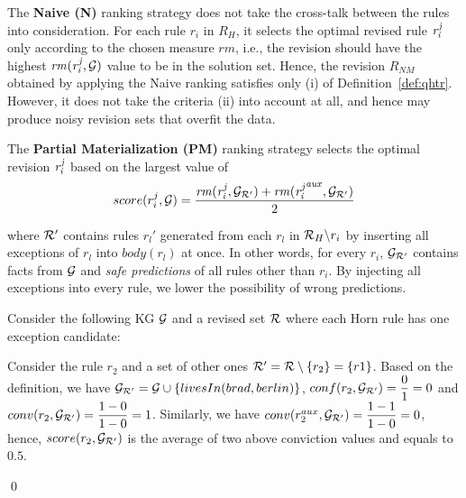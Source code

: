 The \textbf{Naive (N)} ranking strategy does not take the cross-talk between the rules into consideration. For each rule $r_i$ in $R_H$, it selects the optimal revised rule $\mathit{r^j_i}$ only according to the chosen measure $rm$, i.e., the revision should have the highest $\mathit{rm(r^j_{i},\mathcal{G})}$ value to be in the solution set. Hence, the revision $R_{NM}$ obtained by applying the Naive ranking satisfies only (i) of Definition~\ref{def:qhtr}. However, it does not take the criteria (ii) into account at all, and hence may produce noisy revision sets that overfit the data.

The \textbf{Partial Materialization (PM)} ranking strategy selects the optimal revision $\mathit{r^j_i}$ based on the largest value of
\begin{equation}
\label{pm}
score(r^j_i,\mathcal{G})=\dfrac{\mathit{rm(r^j_i,\mathcal{G}_{\mathcal{R}'})+rm({r^j_i}^{aux},\mathcal{G}_{\mathcal{R}'})}}{2}
\end{equation}

where $\mathcal{R}'$ contains rules $r_l'$ generated from each $r_l$ in $\mathcal{R}_H\backslash r_i$ by inserting all exceptions of $r_l$ into $body(r_l)$ at once. In other words, for every $r_i$, $\mathcal{G}_{\mathcal{R}'}$ contains facts from $\mathcal{G}$ and \textit{safe predictions} of all rules other than $r_i$. By injecting all exceptions into every rule, we lower the possibility of wrong predictions.

\begin{example}\label{ex:as}
Consider the following KG $\mathcal{G}$ and a revised set $\mathcal{R}$ where each Horn rule has one exception candidate:\\
{\small {}}
{\small {}}            
\normalsize
{\smallskip

\noindent            

Consider the rule $r_2$ and a set of other ones $\mathcal{R}' = \mathcal{R} \setminus \{r_2\} = \{r1\}$. Based on the definition, we have $\mathcal{G}_{\mathcal{R}'} = \mathcal{G} \cup \{livesIn(brad,berlin)\}$, $conf(r_2, \mathcal{G}_{\mathcal{R}'}) = \dfrac{0}{1} = 0$ and $conv(r_2, \mathcal{G}_{\mathcal{R}'}) = \dfrac{1 - 0}{1 - 0} = 1$. Similarly, we have $conv(r_2^{aux}, \mathcal{G}_{\mathcal{R}'}) = \dfrac{1 - 1}{1 - 0} = 0$, hence, $score(r_2, \mathcal{G}_{\mathcal{R}'})$ is the average of two above conviction values and equals to $0.5$.
}\qed
\end{example}


